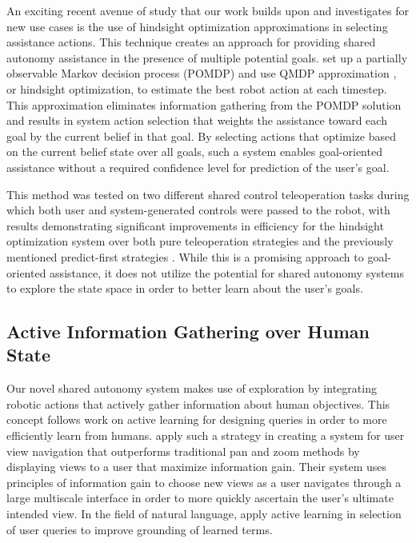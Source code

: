 \documentclass[conference]{IEEEtran}
\begin{document}
An exciting recent avenue of study that our work builds upon and investigates for new use cases is the use of hindsight optimization approximations in selecting assistance actions. This technique creates an approach for providing shared autonomy assistance in the presence of multiple potential goals. \citet{javdani2015shared} set up a partially observable Markov decision process (POMDP) and use QMDP approximation \cite{littman1995learning}, or hindsight optimization, to estimate the best robot action at each timestep. This approximation eliminates information gathering from the POMDP solution and results in system action selection that weights the assistance toward each goal by the current belief in that goal. By selecting actions that optimize based on the current belief state over all goals, such a system enables goal-oriented assistance without a required confidence level for prediction of the user's goal. 

This method was tested on two different shared control teleoperation tasks during which both user and system-generated controls were passed to the robot, with results demonstrating significant improvements in efficiency for the hindsight optimization system over both pure teleoperation strategies and the previously mentioned predict-first strategies \cite{javdani2018shared}. While this is a promising approach to goal-oriented assistance, it does not utilize the potential for shared autonomy systems to explore the state space in order to better learn about the user's goals.

\subsection{Active Information Gathering over Human State}
Our novel shared autonomy system makes use of exploration by integrating robotic actions that actively gather information about human objectives. This concept follows work on active learning for designing queries in order to more efficiently learn from humans. \citet{liu2017bignav} apply such a strategy in creating a system for user view navigation that outperforms traditional pan and zoom methods by displaying views to a user that maximize information gain. Their system uses principles of information gain to choose new views as a user navigates through a large multiscale interface in order to more quickly ascertain the user's ultimate intended view. In the field of natural language, \citet{thomason2017opportunistic} apply active learning in selection of user queries to improve grounding of learned terms.
\end{document}
